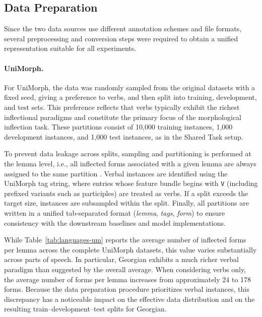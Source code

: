 \subsection{Data Preparation}

Since the two data sources use different annotation schemes and file formats, several preprocessing and conversion steps were required to obtain a unified representation suitable for all experiments.

\paragraph{UniMorph.}

For UniMorph, the data was randomly sampled from the original datasets with a fixed seed, giving a preference to verbs, and then split into training, development, and test sets. This preference reflects that verbs typically exhibit the richest inflectional paradigms and constitute the primary focus of the morphological inflection task. These partitions consist of 10{,}000 training instances, 1{,}000 development instances, and 1{,}000 test instances, as in the Shared Task setup.

To prevent data leakage across splits, sampling and partitioning is performed at the lemma level, i.e., all inflected forms associated with a given lemma are always assigned to the same partition \parencite{goldman-etal-2022-un}. Verbal instances are identified using the UniMorph tag string, where entries whose feature bundle begins with \texttt{V} (including prefixed variants such as participles) are treated as verbs. If a split exceeds the target size, instances are subsampled within the split. Finally, all partitions are written in a unified tab-separated format (\textit{lemma}, \textit{tags}, \textit{form}) to ensure consistency with the downstream baselines and model implementations.

While Table~\ref{tab:languages-um} reports the average number of inflected forms per lemma across the complete UniMorph datasets, this value varies substantially across parts of speech. In particular, Georgian exhibits a much richer verbal paradigm than suggested by the overall average. When considering verbs only, the average number of forms per lemma increases from approximately 24 to 178 forms. Because the data preparation procedure prioritizes verbal instances, this discrepancy has a noticeable impact on the effective data distribution and on the resulting train–development–test splits for Georgian.

